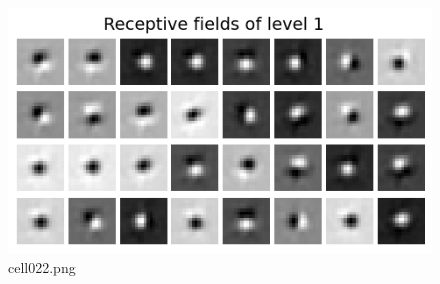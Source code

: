 \begin{figure}[ht]
	\centering
	\includegraphics[scale=0.8, max width=\linewidth]{./fig/energy-based-model/predictive-coding/cell022.png}
	\caption{cell022.png}
	\label{cell022.png}
\end{figure}